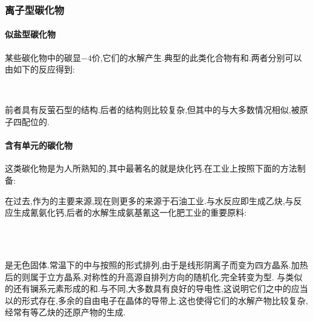 \documentclass{ctexart}
\begin{document}
\subsubsection{离子型碳化物}
\paragraph{似盐型碳化物}
某些碳化物中的碳显$-4$价,它们的水解产生.典型的此类化合物有和.两者分别可以由如下的反应得到:
\begin{center}
    \\
\end{center}
前者具有反萤石型的结构.后者的结构则比较复杂,但其中的与大多数情况相似,被原子四配位的.
\paragraph{含有单元的碳化物}
这类碳化物是为人所熟知的,其中最著名的就是炔化钙.在工业上按照下面的方法制备:
\begin{center}
\end{center}
在过去,作为的主要来源,现在则更多的来源于石油工业.与水反应即生成乙炔,与反应生成氰氨化钙,后者的水解生成氨基氰这一化肥工业的重要原料:
\begin{center}
    \\
    \\
\end{center}
是无色固体.常温下的中与按照的形式排列,由于是线形阴离子而变为四方晶系.加热后的则属于立方晶系,对称性的升高源自排列方向的随机化,完全转变为型.
与类似的还有镧系元素形成的和.与不同,大多数具有良好的导电性,这说明它们之中的应当以的形式存在,多余的自由电子在晶体的导带上.这也使得它们的水解产物比较复杂,经常有等乙炔的还原产物的生成.
\end{document}
